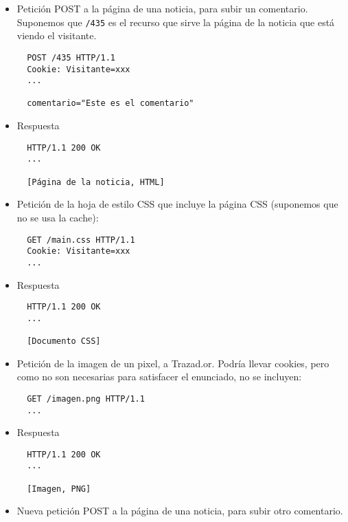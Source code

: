 \begin{itemize}

\item Petición POST a la página de una noticia, para subir un comentario. Suponemos que \texttt{/435} es el recurso que sirve la página de la noticia que está viendo el visitante. 

\begin{verbatim}
  POST /435 HTTP/1.1
  Cookie: Visitante=xxx
  ...

  comentario="Este es el comentario"
\end{verbatim}

\item Respuesta

\begin{verbatim}
  HTTP/1.1 200 OK
  ...

  [Página de la noticia, HTML]
\end{verbatim}

\item Petición de la hoja de estilo CSS que incluye la página CSS (suponemos que no se usa la cache):

  \begin{verbatim}
  GET /main.css HTTP/1.1
  Cookie: Visitante=xxx
  ...
\end{verbatim}

\item Respuesta

\begin{verbatim}
  HTTP/1.1 200 OK
  ...

  [Documento CSS]
\end{verbatim}

\item Petición de la imagen de un pixel, a Trazad.or. Podría llevar cookies, pero como no son necesarias para satisfacer el enunciado, no se incluyen:

  \begin{verbatim}
  GET /imagen.png HTTP/1.1
  ...
\end{verbatim}

\item Respuesta

\begin{verbatim}
  HTTP/1.1 200 OK
  ...

  [Imagen, PNG]
\end{verbatim}
  
\item Nueva petición POST a la página de una noticia, para subir otro comentario.


\end{itemize}
